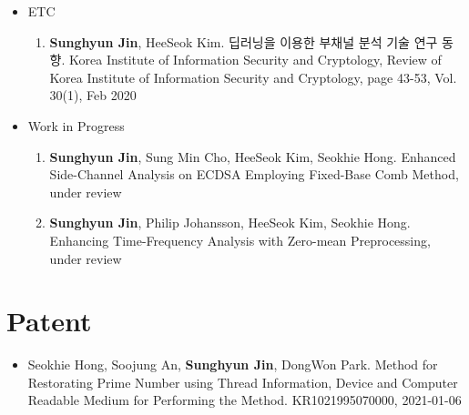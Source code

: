 \documentclass[a4paper,20pt]{article}
\begin{document}
\begin{itemize}
    \item {ETC}
        \vspace{-6pt}
        \begin{enumerate}
            \item {\textbf{Sunghyun Jin}, HeeSeok Kim. 딥러닝을 이용한 부채널 분석 기술 연구 동향. Korea Institute of Information Security and Cryptology, Review of Korea Institute of Information Security and Cryptology, page 43-53, Vol. 30(1), Feb 2020}
            \vspace{-2pt}
        \end{enumerate}

    \item {Work in Progress}
        \vspace{-6pt}
        \begin{enumerate}
            \item {\textbf{Sunghyun Jin}, Sung Min Cho, HeeSeok Kim, Seokhie Hong. Enhanced Side-Channel Analysis on ECDSA Employing Fixed-Base Comb Method, under review}
            \vspace{-2pt}
            \item {\textbf{Sunghyun Jin}, Philip Johansson, HeeSeok Kim, Seokhie Hong. Enhancing Time-Frequency Analysis with Zero-mean Preprocessing, under review}
            \vspace{-2pt}
        \end{enumerate}
\end{itemize}



\section{\textbf{Patent}}
\begin{itemize}
    \item {Seokhie Hong, Soojung An, \textbf{Sunghyun Jin}, DongWon Park. Method for Restorating Prime Number using Thread Information, Device and Computer Readable Medium for Performing the Method. KR1021995070000, 2021-01-06}
\end{itemize}



\iffalse
\section{\textbf{Project}}
    \item {Work in Progress}
        \vspace{-6pt}
        \begin{enumerate}
            \item {blah}
            \vspace{-2pt}
        \end{enumerate}
    \begin{itemize}
        \item {blah}
        \vspace{-4pt}
\end{itemize}
\fi
\end{document}
